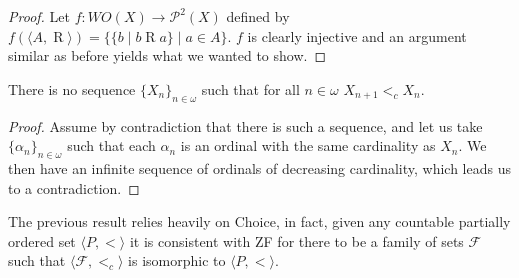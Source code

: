
\begin{proof}
	
	Let $f:WO(X)\rightarrow \mathcal{P}^2(X)$ defined by $f(\langle A,\mathrel{R}\rangle) = \{\{b\mid b \mathrel{R} a\} \mid a\in A\}$. $f$ is clearly injective and an argument similar as before yields what we wanted to show.
\end{proof}

\begin{theorem}[ZFC]
	There is no sequence $\{X_n\}_{n\in\omega}$ such that for all $n\in\omega$ $X_{n+1} <_c X_n$.
\end{theorem}
\begin{proof}
	Assume by contradiction that there is such a sequence, and let us take $\{\alpha_n\}_{n\in\omega}$ such that each $\alpha_n$ is an ordinal with the same cardinality as $X_n$. We then have an infinite sequence of ordinals of decreasing cardinality, which leads us to a contradiction.
\end{proof}


The previous result relies heavily on Choice, in fact, given any countable partially ordered set $\langle P,< \rangle$ it is consistent with ZF for there to be a family of sets $\mathcal{F}$ such that $\langle \mathcal{F},<_c\rangle$ is isomorphic to $\langle P,< \rangle$.

